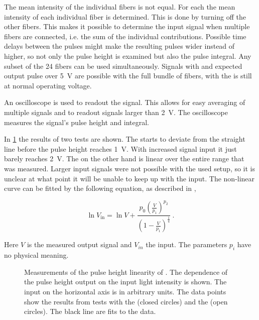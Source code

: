The mean intensity of the individual fibers is not equal. For each \pmt the mean intensity of each individual fiber is determined. This is done by turning off the other fibers. This makes it possible to determine the input signal when multiple fibers are connected, i.e. the sum of the individual contributions. Possible time delays between the pulses might make the resulting pulses wider instead of higher, so not only the pulse height is examined but also the pulse integral. Any subset of the 24 fibers can be used simultaneously. Signals with and expected \pmt output pulse over \SI{5}{\volt} are possible with the full bundle of fibers, with the \pmt is still at normal operating voltage.

An oscilloscope is used to readout the \pmt signal. This allows for easy averaging of multiple signals and to readout signals larger than \SI{2}{\volt}. The oscilloscope measures the signal's pulse height and integral.

In \cref{fig:linearity_pmts} the results of two \pmt tests are shown. The \senstech \pmt starts to deviate from the straight line before the pulse height reaches \SI{1}{\volt}. With increased signal input it just barely reaches \SI{2}{\volt}. The \nikhef \pmt on the other hand is linear over the entire range that was measured. Larger input signals were not possible with the used setup, so it is unclear at what point it will be unable to keep up with the input. The non-linear curve can be fitted by the following equation, as described in \cite{icecube2010pmt},

\begin{equation}
    \ln V_{\mathrm{in}} = \ln V +
                          \frac{p_0 \left(\frac{V}{p_1}\right)^{p_2}}
                               {\left(1 - \frac{V}{p_1}\right)^{\frac{1}{4}}} \ .
\end{equation}

Here $V$ is the measured output signal and $V_{in}$ the input. The parameters $p_i$ have no physical meaning.

\begin{figure}
    \centering
    
    \caption{Measurements of the pulse height linearity of \pmts. The dependence of the pulse height output on the input light intensity is shown. The input on the horizontal axis is in arbitrary units. The data points show the results from tests with the \senstech \pmt (closed circles) and the \nikhef \pmt (open circles). The black line are fits to the data.}
    \label{fig:linearity_pmts}
\end{figure}

